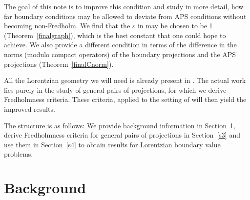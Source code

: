 \documentclass[pdftex]{sigma}
\numberwithin{equation}{section}
\begin{document}
The goal of this note is to improve this condition and study in more detail, how far boundary conditions may be allowed to deviate from APS conditions without becoming non-Fredholm. We find that the $\varepsilon$ in \cite[Proposition~4.5]{BH} may be chosen to be 1 (Theorem~\ref{finalgraph}), which is the best constant that one could hope to achieve. We also provide a different condition in terms of the difference in the norms (modulo compact operators) of the boundary projections and the APS projections (Theorem~\ref{finalCnorm}).
	
	All the Lorentzian geometry we will need is already present in \cite{BH}. The actual work lies purely in the study of general pairs of projections, for which we derive Fredholmness criteria. These criteria, applied to the setting of \cite{BH} will then yield the improved results.
	
	The structure is as follows: We provide background information in Section~\ref{s2}, derive Fredholmness criteria for general pairs of projections in Section~\ref{s3} and use them in Section~\ref{s4} to obtain results for Lorentzian boundary value problems.
	
\section{Background}\label{s2}
\end{document}
